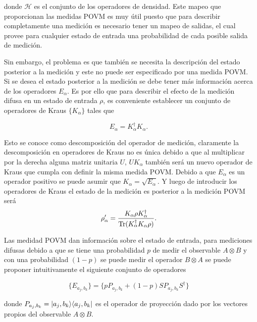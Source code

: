     donde $\mathcal{H}$ es el conjunto de los operadores de densidad. Este mapeo que proporcionan las medidas POVM es muy útil puesto que para describir completamente una medición es necesario tener un mapeo de salidas, el cual provee para cualquier estado de entrada una probabilidad de cada posible salida de medición. 
    
    
    Sin embargo, el problema es que también se necesita la descripción del estado posterior a la medición y este no puede ser especificado por una medida POVM\@. Si se desea el estado posterior a la medición se debe tener más información acerca de los operadores $E_\alpha$. Es por ello que para describir el efecto de la medición difusa en un estado de entrada $\rho$, es conveniente establecer un conjunto de operadores de Kraus $\{K_\alpha\}$ tales que 
    
    \begin{equation}E_\alpha=K_\alpha^\dagger K_\alpha.\end{equation}
    
    Esto se conoce como descomposición del operador de medición, claramente la descomposición en operadores de Kraus no es única debido a que al multiplicar por la derecha alguna matriz unitaria $U$, $UK_\alpha$ también será un nuevo operador de Kraus que cumpla con definir la misma medida POVM\@. Debido a que $E_\alpha$ es un operador positivo se puede asumir que $K_\alpha=\sqrt{E_\alpha}$. Y luego de introducir los operadores de Kraus el estado de la medición es posterior a la medición POVM será 
    \begin{equation}\rho'_\alpha=\dfrac{K_\alpha \rho K_\alpha^\dagger}{{\rm Tr}(K_\alpha^\dagger K_\alpha \rho)}.\end{equation}
    
    Las medidad POVM dan información sobre el estado de entrada, para mediciones difusas debido a que se tiene una probabilidad $p$ de medir el observable $A\otimes B$ y con una probabilidad $(1-p)$ se puede medir el operador $B\otimes A$ se puede proponer intuitivamente el siguiente conjunto de operadores
    
    \begin{equation}\{E_{a_j, b_k}\}= \{p P_{a_j,b_k}+(1-p)SP_{a_j,b_k}S^\dagger\}\end{equation}

    donde $P_{a_j,b_k} = |a_j, b_k\rangle \langle a_j,b_k|$ es el operador de proyección dado por los vectores propios del observable $A\otimes B$.







